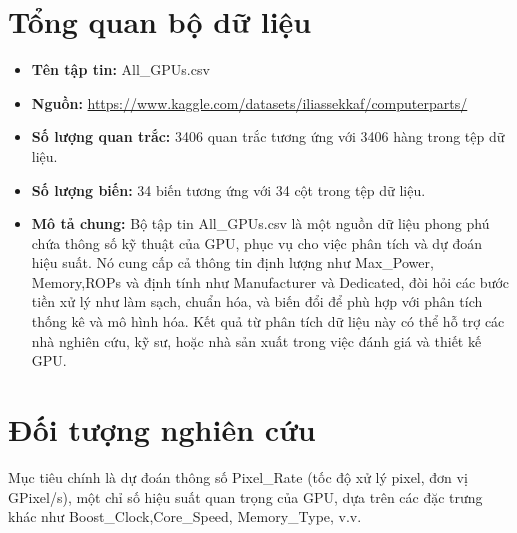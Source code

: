 \section{Tổng quan bộ dữ liệu}
\begin{itemize}
    \item \textbf{Tên tập tin:} \colorbox{black!10}{All\_GPUs.csv}
    \item \textbf{Nguồn:} \href{https://www.kaggle.com/datasets/iliassekkaf/computerparts/}{https://www.kaggle.com/datasets/iliassekkaf/computerparts/}
    \item \textbf{Số lượng quan trắc:} 3406 quan trắc tương ứng với 3406 hàng trong tệp dữ liệu.
    \item \textbf{Số lượng biến:} 34 biến tương ứng với 34 cột trong tệp dữ liệu.
    \item \textbf{Mô tả chung:} Bộ tập tin All\_GPUs.csv là một nguồn dữ liệu phong phú chứa thông số kỹ thuật của GPU, phục vụ cho việc phân tích và dự đoán hiệu suất. Nó cung cấp cả thông tin định lượng như \colorbox{black!10}{Max\_Power}, \colorbox{black!10}{Memory},\colorbox{black!10}{ROPs} và định tính như \colorbox{black!10}{Manufacturer} và \colorbox{black!10}{Dedicated}, đòi hỏi các bước tiền xử lý như làm sạch, chuẩn hóa, và biến đổi để phù hợp với phân tích thống kê và mô hình hóa. Kết quả từ phân tích dữ liệu này có thể hỗ trợ các nhà nghiên cứu, kỹ sư, hoặc nhà sản xuất trong việc đánh giá và thiết kế GPU.
\end{itemize}

\section{Đối tượng nghiên cứu}

Mục tiêu chính là dự đoán thông số \colorbox{red!10}{Pixel\_Rate} (tốc độ xử lý pixel, đơn vị GPixel/s), một chỉ số hiệu suất quan trọng của GPU, dựa trên các đặc trưng khác như \colorbox{blue!10}{Boost\_Clock},\newline \colorbox{blue!10}{Core\_Speed}, \colorbox{blue!10}{Memory\_Type}, v.v.

